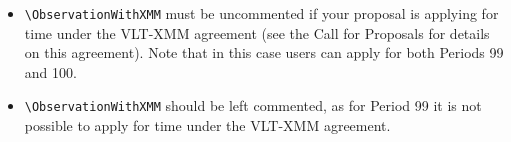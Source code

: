 \documentclass{article}
\begin{document}
\ifodd\period
 \begin{itemize}
  \item \verb|\ObservationWithXMM| must be uncommented if your proposal
   is applying for time under the VLT-XMM agreement (see the Call for
   Proposals for details on this agreement).  Note that in this case
   users can apply for both Periods 99 and 100.
 \end{itemize}
\else
 \begin{itemize}
 \item \verb|\ObservationWithXMM| should be left commented, as for
   Period 99 it is not possible to apply for time under the
   VLT-XMM agreement.
 \end{itemize}
\fi

\end{document}
